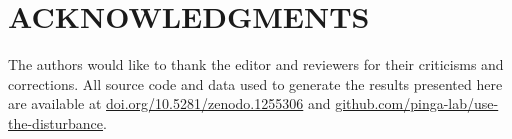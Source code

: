 \documentclass[paper,twocolumn,twoside]{geophysics}
\begin{document}


\section{ACKNOWLEDGMENTS}

The authors would like to thank the editor and reviewers for their criticisms
and corrections. All source code and data used to generate the results presented 
here are available at
\href{https://doi.org/10.5281/zenodo.1255306}{doi.org/10.5281/zenodo.1255306}
and
\href{https://github.com/pinga-lab/use-the-disturbance}{github.com/pinga-lab/use-the-disturbance}.




 
\end{document}
